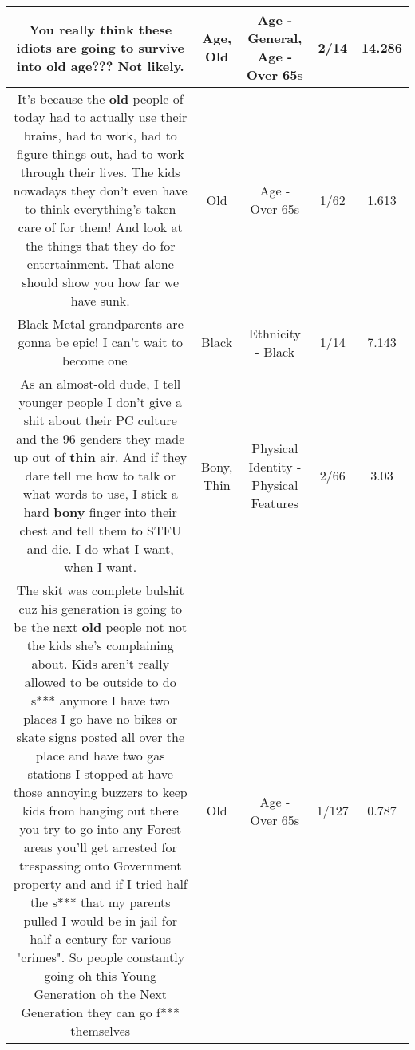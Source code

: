 \documentclass[11pt]{article}
\newlength\mylength
\begin{document}
\begin{center}
\begin{longtable}{|C{.65\mylength}|C{.30\mylength}|C{.12\mylength}|C{.12\mylength}|C{.12\mylength}|}
  \small You really think these idiots are going to survive into \textbf{old} \textbf{age}??? Not likely.\normalsize   & Age, Old & Age - General, Age - Over 65s & 2/14 & 14.286 \\  \hline
  \small It's because the \textbf{old} people of today had to actually use their brains, had to work, had to figure things out, had to work through their lives. The kids nowadays they don't even have to think everything's taken care of for them! And look at the things that they do for entertainment. That alone should show you how far we have sunk.\normalsize   & Old & Age - Over 65s & 1/62 & 1.613 \\  \hline
  \small Black Metal grandparents are gonna be epic! I can't wait to become one 🤘🏻\normalsize   & Black & Ethnicity - Black & 1/14 & 7.143 \\  \hline
  \small As an almost-old dude, I tell younger people I don't give a shit about their PC culture and the 96 genders they made up out of \textbf{thin} air. And if they dare tell me how to talk or what words to use, I stick a hard \textbf{bony} finger into their chest and tell them to STFU and die.  I do what I want, when I want.\normalsize   & Bony, Thin & Physical Identity - Physical Features & 2/66 & 3.03 \\  \hline
  \small The skit was complete bulshit cuz his generation is going to be the next \textbf{old} people not not the kids she's complaining about. Kids aren't really allowed to be outside to do s*** anymore I have two places I go have no bikes or skate signs posted all over the place and have two gas stations I stopped at have those annoying buzzers to keep kids from hanging out there you try to go into any Forest areas you'll get arrested for trespassing onto Government property and and if I tried half the s*** that my parents pulled I would be in jail for half a century for various "crimes". So people constantly going oh this Young Generation oh the Next Generation they can go f*** themselves\normalsize   & Old & Age - Over 65s & 1/127 & 0.787 \\  \hline

\end{longtable}
\end{center}
\end{document}
